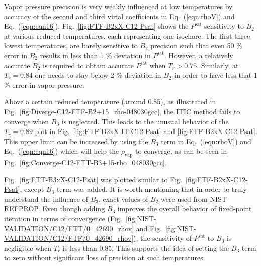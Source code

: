 \documentclass[%
 aip,
 jcp,
 sd,%
 amsmath,amssymb,
 reprint,%
]{revtex4-1}
\begin{document}
Vapor pressure precision is very weakly influenced at low temperatures by accuracy of the second and third virial coefficients in Eq.~(\ref{eqn:rhoV}) and Eq.~(\ref{eqn:eqn16}). Fig.~\ref{fig:FTF-B2xX-C12-Psat} shows the $P^{\mathrm{sat}}$ sensitivity to $B_2$ at various reduced temperatures, each representing one isochore. The first three lowest temperatures, are barely sensitive to $B_2$ precision such that even 50 \% error in $B_2$ results in less than 1 \% deviation in $P^{\mathrm{sat}}$. However, a relatively accurate $B_2$ is required to obtain accurate $P^{\mathrm{sat}}$ when $T_r>0.75$. Similarly, at $T_r=0.84$ one needs to stay below 2 \% deviation in $B_2$ in order to have less that 1 \% error in vapor pressure.

Above a certain reduced temperature (around 0.85), as illustrated in Fig.~\ref{fig:Diverge-C12-FTF-B2+15_rho-048030gcc}, the ITIC method fails to converge when $B_3$ is neglected. This leads to the unusual behavior of the $T_r=0.89$ plot in Fig.~\ref{fig:FTF-B2xX-IT-C12-Psat} and \ref{fig:FTF-B2xX-C12-Psat}. This upper limit can be increased by using the $B_3$ term in Eq.~(\ref{eqn:rhoV}) and Eq.~(\ref{eqn:eqn16}) which will help the $\rho_{\mathrm{vap}}$ to converge, as can be seen in Fig.~\ref{fig:Converge-C12-FTT-B3+15-rho_048030gcc}.

Fig.~\ref{fig:FTT-B3xX-C12-Psat} was plotted similar to Fig.~\ref{fig:FTF-B2xX-C12-Psat}, except $B_3$ term was added. It is worth mentioning that in order to truly understand the influence of $B_3$, exact values of $B_2$ were used from NIST REFPROP. Even though adding $B_3$ improves the overall behavior of fixed-point iteration in terms of convergence (Fig.~\ref{fig:NIST-VALIDATION/C12/FTT/0_42690_rhov} and Fig.~\ref{fig:NIST-VALIDATION/C12/FTF/0_42690_rhov}), the sensitivity of $P^{\mathrm{sat}}$ to $B_3$ is negligible when $T_r$ is less than 0.85. This supports the idea of setting the $B_3$ term to zero without significant loss of precision at such temperatures. 
\end{document}
